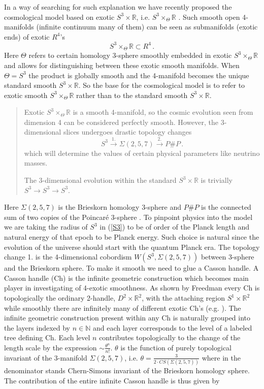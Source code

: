 \documentclass[12pt]{article}
\begin{document}
In a way of searching for such explanation we have recently proposed the cosmological model based on exotic $S^3\times \mathbb{R}$, i.e. $S^3\times_{\Theta}\mathbb{R}$ \cite{AK2018,AK2014,AK2019}. Such smooth open 4-manifolds (infinite continuum many of them) can be seen as submanifolds (exotic ends) of exotic $R^4$'s
\[ S^3\times_{\Theta} \mathbb{R}\subset R^4\,. \]
Here $\Theta$ refers to certain homology 3-sphere smoothly embedded in exotic $S^3\times_{\Theta} \mathbb{R}$
and allows for distinguishing between these exotic smooth manifolds. When $\Theta = S^3$ the product is globally smooth and the 4-manifold becomes the unique standard smooth $S^3\times \mathbb{R}$. 
So the base for the cosmological model is to refer to exotic smooth $S^3\times_{\Theta}\mathbb{R}$ rather than to the standard smooth $S^3\times \mathbb{R}$.
\begin{quotation}
Exotic $S^3\times_{\Theta}\mathbb{R}$ is a smooth 4-manifold, so the cosmic evolution seen from dimension 4 can be considered perfectly smooth. However, the 3-dimensional slices undergoes drastic topology changes
\begin{equation}\label{S3}S^3\overset{1.}{\to} \Sigma(2,5,7) \overset{2.}{\to}P\# P\,.  \end{equation}
which will determine the values of certain physical parameters like neutrino masses.

The 3-dimensional evolution within the standard $S^3\times \mathbb{R}$ is trivially $S^3\to S^3\to S^3$.
\end{quotation}
Here $\Sigma(2,5,7)$ is the Brieskorn homology 3-sphere and $P\# P$ is the connected sum of two copies of the Poincar{\'e} 3-sphere \cite{AK2018,AK2019}. To pinpoint physics into the model we are taking the radius of $S^3$ in (\ref{S3}) to be of order of the Planck length and natural energy of that epoch to be Planck energy. Such choice is natural since the evolution of the universe should start with the quantum Planck era. The topology change 1. is the 4-dimensional cobordism $W(S^3,\Sigma(2,5,7))$ between 3-sphere and the Brieskorn sphere. To make it smooth we need to glue a Casson handle. A Casson handle (Ch) is the infinite geometric construction which becomes main player in investigating of 4-exotic smoothness. As shown by Freedman every Ch is topologically the ordinary 2-handle, $D^2\times \mathbb{R}^2$, with the attaching region $S^1\times \mathbb{R}^2$ while smoothly there are infinitely many of different exotic Ch's (e.g. \cite{GS1999}). The infinite geometric construction present within any Ch is naturally grouped into the layers indexed by $n\in \mathbb{N}$ and each layer corresponds to the level of a labeled tree defining Ch. Each level $n$ contributes topologically to the change of the length scale by the expression $\sim \frac{\theta^n}{n!}$. $\theta$ is the function of purely topological invariant of the 3-manifold $\Sigma(2,5,7)$, i.e. $\theta =\frac{3}{2\cdot CS(\Sigma(2,5,7))}$ where in the denominator stands Chern-Simons invariant of the Brieskorn homology sphere. The contribution of the entire infinite Casson handle is thus given by \cite{AK2018,AK2014,AK2019}
\end{document}
